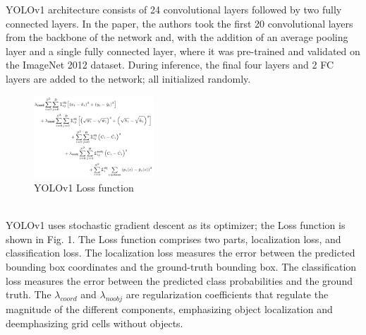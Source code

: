 \documentclass[10pt,twocolumn,letterpaper]{article}
\begin{document}
YOLOv1 architecture consists of 24 convolutional layers followed by two fully connected layers. In the paper, the authors took the first 20 convolutional layers from the backbone of the network and, with the addition of an average pooling layer and a single fully connected layer, where it was pre-trained and validated on the ImageNet 2012 dataset. During inference, the final four layers and 2 FC layers are added to the network; all initialized randomly.
\begin{figure}[h]
    \centering
    \includegraphics[width=0.4\textwidth]{figures/YOLO_Loss.png}
    \caption{YOLOv1 Loss function ~\cite{YOLO_OG}}
    \label{fig:YOLO_Loss}
\end{figure}\\
YOLOv1 uses stochastic gradient descent as its optimizer; the Loss function is shown in Fig. 1. The Loss function comprises two parts, localization loss, and classification loss. The localization loss measures the error between the predicted bounding box coordinates and the ground-truth bounding box. The classification loss measures the error between the predicted class probabilities and the ground truth. The $\lambda_{coord}$ and $\lambda_{noobj}$ are regularization coefficients that regulate the magnitude of the different components, emphasizing object localization and deemphasizing grid cells without objects.\\
\end{document}
